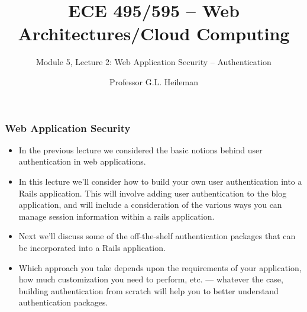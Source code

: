 \documentclass[t,handout]{beamer}
\title[Module 5, Lecture 2]{ECE 495/595 -- Web Architectures/Cloud Computing}
\subtitle{Module 5, Lecture 2: Web Application Security -- Authentication}
\author[\copyright \ 2011-12 G. L. Heileman]{Professor G.L. Heileman}
\date{}
\institute[University of New Mexico]{\large University of New Mexico}
\begin{document}
\begin{frame}
\titlepage
\end{frame}


\begin{frame}\frametitle{Web Application Security}
\begin{itemize}
\item In the previous lecture we considered the basic notions behind user authentication in web applications.
 \pause
 \item In this lecture we'll consider how to build your own user authentication into a Rails application. \pause
 This will involve adding user authentication to the blog application, and will include a consideration of the various ways you can manage session information within a rails application.
 \pause
 \item Next we'll discuss some of the off-the-shelf authentication packages that can be incorporated into a Rails application.
 \pause
 \item Which approach you take depends upon the requirements of your application, how much customization you need to
 perform, etc. --- whatever the case,  building authentication from scratch will help you to better understand 
 authentication packages.
\end{itemize}
\end{frame}
\end{document}
